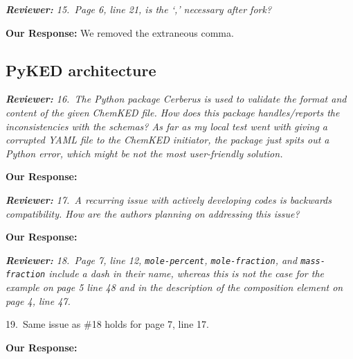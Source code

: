\documentclass[a4paper,10pt]{elsarticle}
\newenvironment{reviewer}{\vspace{0.5\baselineskip}\begingroup\itshape\textbf{Reviewer:}}{\endgroup\vspace{0.5\baselineskip}}
\newenvironment{response}{\vspace{0.5\baselineskip}\textbf{Our Response:}}{\vspace{0.5\baselineskip}}
\begin{document}
\begin{reviewer}
    15.~Page 6, line 21, is the `,' necessary after fork?
\end{reviewer}

\begin{response}
    We removed the extraneous comma.
\end{response}

\subsection*{PyKED architecture}

\begin{reviewer}
    16.~The Python package Cerberus is used to validate the format and content of the given ChemKED
    file. How does this package handles/reports the inconsistencies with the schemas? As far as my
    local test went with giving a corrupted YAML file to the ChemKED initiator, the package just
    spits out a Python error, which might be not the most user-friendly solution.
\end{reviewer}

\begin{response}

\end{response}

\begin{reviewer}
    17.~A recurring issue with actively developing codes is backwards compatibility. How are the
    authors planning on addressing this issue?
\end{reviewer}

\begin{response}

\end{response}

\begin{reviewer}
    18.~Page 7, line 12, \texttt{mole-percent}, \texttt{mole-fraction}, and \texttt{mass-fraction}
    include a dash in their name, whereas this is not the case for the example on page 5 line 48 and
    in the description of the composition element on page 4, line 47.

    19.~Same issue as \#18 holds for page 7, line 17.
\end{reviewer}

\begin{response}

\end{response}
\end{document}
